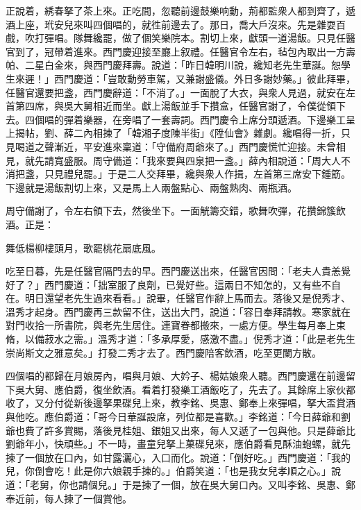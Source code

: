 正說着，綉春拏了茶上來。正吃間，忽聽前邊鼓樂响動，荊都監衆人都到齊了，遞酒上座，玳安兒來叫四個唱的，就徃前邊去了。那日，喬大戶沒來。先是雜耍百戲，吹打彈唱。隊舞纔罷，做了個笑樂院本。割切上來，獻頭一道湯飯。只見任醫官到了，冠帶着進來。西門慶迎接至廳上叙禮。任醫官令左右，毡包內取出一方壽帕、二星白金來，與西門慶拜壽。說道：「昨日韓明川說，纔知老先生華誕。恕學生來遲！」西門慶道：「豈敢動勞車駕，又兼謝盛儀。外日多謝妙藥。」彼此拜畢，任醫官還要把盞，西門慶辭道：「不消了。」一面脫了大衣，與衆人見過，就安在左首第四席，與吳大舅相近而坐。獻上湯飯並手下攢盒，任醫官謝了，令僕從領下去。四個唱的彈着樂器，在旁唱了一套壽詞。西門慶令上席分頭遞酒。下邊樂工呈上揭帖，劉、薛二內相揀了「韓湘子度陳半街」《陞仙會》雜劇。纔唱得一折，只見喝道之聲漸近，平安進來稟道：「守備府周爺來了。」西門慶慌忙迎接。未曾相見，就先請寬盛服。周守備道：「我來要與四泉把一盞。」薛內相說道：「周大人不消把盞，只見禮兒罷。」于是二人交拜畢，纔與衆人作揖，左首第三席安下鍾筯。下邊就是湯飯割切上來，又是馬上人兩盤點心、兩盤熟肉、兩瓶酒。

周守備謝了，令左右領下去，然後坐下。一面觥籌交錯，歌舞吹彈，花攢錦簇飲酒。正是：

\begin{myquote} 
舞低楊柳樓頭月，歌罷桃花扇底風。
\end{myquote} 

吃至日暮，先是任醫官隔門去的早。西門慶送出來，任醫官因問：「老夫人貴恙覺好了？」西門慶道：「拙室服了良劑，已覺好些。這兩日不知怎的，又有些不自在。明日還望老先生過來看看。」說畢，任醫官作辭上馬而去。落後又是倪秀才、溫秀才起身。西門慶再三款留不住，送出大門，說道：「容日奉拜請教。寒家就在對門收拾一所書院，與老先生居住。連寶眷都搬來，一處方便。學生每月奉上束脩，以備菽水之需。」溫秀才道：「多承厚愛，感激不盡。」倪秀才道：「此是老先生崇尚斯文之雅意矣。」打發二秀才去了。西門慶陪客飲酒，吃至更闌方散。

四個唱的都歸在月娘房內，唱與月娘、大妗子、楊姑娘衆人聽。西門慶還在前邊留下吳大舅、應伯爵，復坐飲酒。看着打發樂工酒飯吃了，先去了。其餘席上家伙都收了，又分付從新後邊拏果碟兒上來，教李銘、吳惠、鄭奉上來彈唱，拏大盃賞酒與他吃。應伯爵道：「哥今日華誕設席，列位都是喜歡。」李銘道：「今日薛爺和劉爺也費了許多賞賜，落後見桂姐、銀姐又出來，每人又遞了一包與他。只是薛爺比劉爺年小，快頑些。」不一時，畫童兒拏上菓碟兒來，應伯爵看見酥油蚫螺，就先揀了一個放在口內，如甘露灑心，入口而化。說道：「倒好吃。」西門慶道：「我的兒，你倒會吃！此是你六娘親手揀的。」伯爵笑道：「也是我女兒孝順之心。」說道：「老舅，你也請個兒。」于是揀了一個，放在吳大舅口內。又叫李銘、吳惠、鄭奉近前，每人揀了一個賞他。

